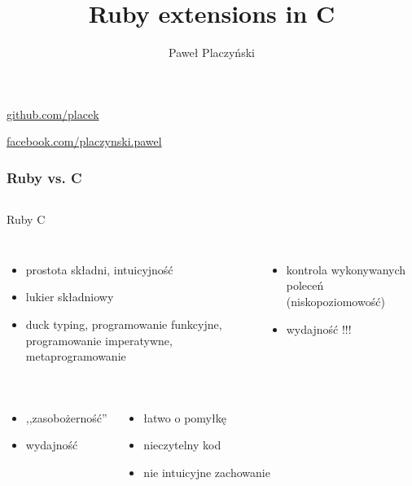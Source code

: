 \documentclass{beamer}
\title{Ruby extensions in C}
\author{Paweł Placzyński}
\institute{Ragnarson}
\begin{document}
  \frame{\titlepage}

  \begin{frame}
    \begin{center}
      \href{https://github.com/placek}{github.com/placek}


      \href{https://facebook.com/placzynski.pawel}{facebook.com/placzynski.pawel}
    \end{center}
  \end{frame}

  \begin{frame}
    \frametitle{Ruby vs. C}
    \begin{columns}[c]
        {\centering \large Ruby}
        {\centering \large C}
    \end{columns}
    \begin{columns}[t]
         {
        \begin{itemize}
          \item \color{forestgreen} prostota składni, intuicyjność
          \item \color{forestgreen} lukier składniowy
          \item \color{forestgreen} duck typing, programowanie funkcyjne, programowanie imperatywne, metaprogramowanie
        \end{itemize}}
         {
        \begin{itemize}
          \item \color{forestgreen} kontrola wykonywanych poleceń (niskopoziomowość)
          \item \color{forestgreen} wydajność !!!
        \end{itemize}}
    \end{columns}
    \begin{columns}[t]
         {
        \begin{itemize}
          \item \color{red} ,,zasobożerność''
          \item \color{red} wydajność
        \end{itemize}}
         {
        \begin{itemize}
          \item \color{red} łatwo o pomyłkę
          \item \color{red} nieczytelny kod
          \item \color{red} nie intuicyjne zachowanie
        \end{itemize}}
    \end{columns}
  \end{frame}
\end{document}
